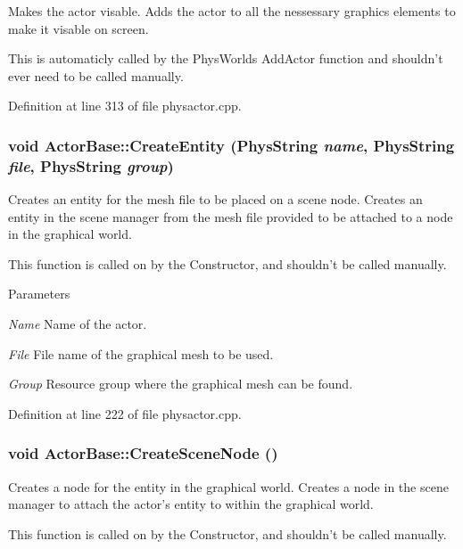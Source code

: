Makes the actor visable. Adds the actor to all the nessessary graphics elements to make it visable on screen. \par
 This is automaticly called by the PhysWorlds AddActor function and shouldn't ever need to be called manually. 

Definition at line 313 of file physactor.cpp.\hypertarget{classActorBase_aa87583c47b8653e8ac7d96f1481b57fd}{
\subsubsection[{CreateEntity}]{\setlength{\rightskip}{0pt plus 5cm}void ActorBase::CreateEntity (PhysString {\em name}, \/  PhysString {\em file}, \/  PhysString {\em group})}}
\label{dd/d7b/classActorBase_aa87583c47b8653e8ac7d96f1481b57fd}


Creates an entity for the mesh file to be placed on a scene node. Creates an entity in the scene manager from the mesh file provided to be attached to a node in the graphical world. \par
 This function is called on by the Constructor, and shouldn't be called manually. 
\begin{DoxyParams}{Parameters}
\item[{\em Name}]Name of the actor. \item[{\em File}]File name of the graphical mesh to be used. \item[{\em Group}]Resource group where the graphical mesh can be found. \end{DoxyParams}


Definition at line 222 of file physactor.cpp.\hypertarget{classActorBase_a168cd57e20b2adfc5cae21627ddbae31}{
\subsubsection[{CreateSceneNode}]{\setlength{\rightskip}{0pt plus 5cm}void ActorBase::CreateSceneNode ()}}
\label{dd/d7b/classActorBase_a168cd57e20b2adfc5cae21627ddbae31}


Creates a node for the entity in the graphical world. Creates a node in the scene manager to attach the actor's entity to within the graphical world. \par
 This function is called on by the Constructor, and shouldn't be called manually. 

